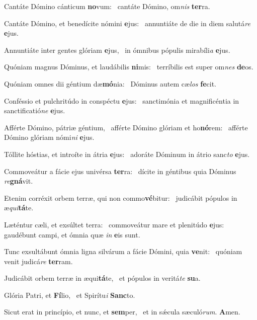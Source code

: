 \item Cantáte Dómino cánticum \textbf{no}vum:~\psstar{} cantáte Dómino, om\textit{nis} \textbf{ter}ra.
\item Cantáte Dómino, et benedícite nómini \textbf{e}jus:~\psstar{} annuntiáte de die in diem salutá\textit{re} \textbf{e}jus.
\item Annuntiáte inter gentes glóriam \textbf{e}jus,~\psstar{} in ómnibus pópulis mirabíli\textit{a} \textbf{e}jus.
\item Quóniam magnus Dóminus, et laudábilis \textbf{ni}mis:~\psstar{} terríbilis est super om\textit{nes} \textbf{de}os.
\item Quóniam omnes dii géntium dæ\textbf{mó}nia:~\psstar{} Dóminus autem cæ\textit{los} \textbf{fe}cit.
\item Conféssio et pulchritúdo in conspéctu \textbf{e}jus:~\psstar{} sanctimónia et magnificéntia in sanctificatió\textit{ne} \textbf{e}jus.
\item Afférte Dómino, pátriæ géntium,~\pscross{} afférte Dómino glóriam et ho\textbf{nó}rem:~\psstar{} afférte Dómino glóriam nómi\textit{ni} \textbf{e}jus.
\item Tóllite hóstias, et introíte in átria \textbf{e}jus:~\psstar{} adoráte Dóminum in átrio sanc\textit{to} \textbf{e}jus.
\item Commoveátur a fácie ejus univérsa \textbf{ter}ra:~\psstar{} dícite in géntibus quia Dóminus \textit{re}\textbf{gná}vit.
\item Etenim corréxit orbem terræ, qui non commo\textbf{vé}bitur:~\psstar{} judicábit pópulos in æ\textit{qui}\textbf{tá}te.
\item Læténtur cæli, et exsúltet terra:~\pscross{} commoveátur mare et plenitúdo \textbf{e}jus:~\psstar{} gaudébunt campi, et ómnia quæ \textit{in} \textbf{e}is sunt.
\item Tunc exsultábunt ómnia ligna silvárum a fácie Dómini, quia \textbf{ve}nit:~\psstar{} quóniam venit judicá\textit{re} \textbf{ter}ram.
\item Judicábit orbem terræ in æqui\textbf{tá}te,~\psstar{} et pópulos in veritá\textit{te} \textbf{su}a.
\item Glória Patri, et \textbf{Fí}lio,~\psstar{} et Spirítu\textit{i} \textbf{Sanc}to.
\item Sicut erat in princípio, et nunc, et \textbf{sem}per,~\psstar{} et in sǽcula sæculó\textit{rum}. \textbf{A}men.